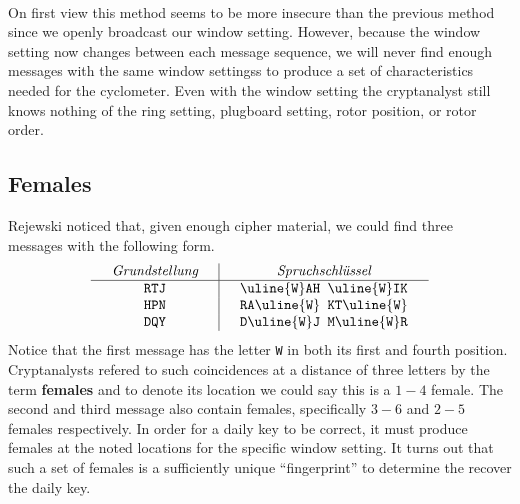 

\text{}\\On first view this method seems to be more insecure than the previous method since we openly broadcast our window setting. However, because the window setting now changes between each message sequence, we will never find enough messages with the same window settingss to produce a set of characteristics needed for the cyclometer. Even with the window setting the cryptanalyst still knows nothing of the ring setting, plugboard setting, rotor position, or rotor order.

\subsection{Females}
Rejewski noticed that, given enough cipher material, we could find three messages with the following form.
\[
	\setlength{\arraycolsep}{15pt}
	\begin{array}{c | c}
		\emph{Grundstellung} & \emph{Spruchschlüssel}                                                   \\
		\hline
		\texttt{RTJ}         & {\uline{\texttt{W}}}\texttt{AH }{\uline{\texttt{W}}}\texttt{IK}          \\
		\texttt{HPN}         & \texttt{RA}{\uline{\texttt{W}}}\texttt{ KT}{\uline{\texttt{W}}}          \\
		\texttt{DQY}         & \texttt{D}{\uline{\texttt{W}}}\texttt{J M}{\uline{\texttt{W}}}\texttt{R}
	\end{array}
\]
Notice that the first message has the letter \texttt{W} in both its first and fourth position. Cryptanalysts refered to such coincidences at a distance of three letters by the term {\bf{females}} and to denote its location we could say this is a $1-4$ female. The second and third message also contain females, specifically $3-6$ and $2-5$ females respectively. In order for a daily key to be correct, it must produce females at the noted locations for the specific window setting. It turns out that such a set of females is a sufficiently unique ``fingerprint'' to determine the recover the daily key.

